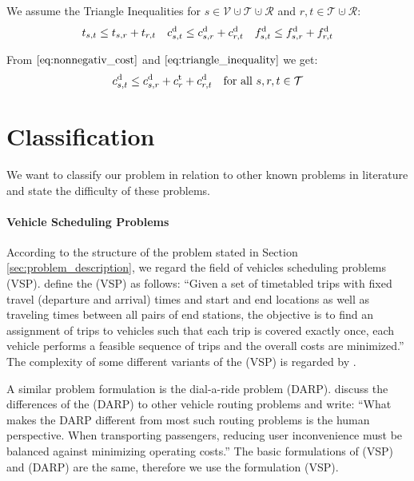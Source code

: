 We assume the Triangle Inequalities for $s\in\mathcal{V}\cupdot\mathcal{T}\cupdot\mathcal{R}$ and $r,t\in\mathcal{T}\cupdot\mathcal{R}$:
\begin{align}
\label{eq:triangle_inequality}
	t_{s,t} \leq t_{s,r} + t_{r,t} && c^{\operatorname{d}}_{s,t} \leq c^{\operatorname{d}}_{s,r} + c^{\operatorname{d}}_{r,t} && f^{\operatorname{d}}_{s,t} \leq f^{\operatorname{d}}_{s,r} + f^{\operatorname{d}}_{r,t}
\end{align}

From $\eqref{eq:nonnegativ_cost}$ and $\eqref{eq:triangle_inequality}$ we get:
\begin{align}
\label{eq:triangle_inequality_ext}
	c^{\operatorname{d}}_{s,t} \leq c^{\operatorname{d}}_{s,r} + c^{\operatorname{t}}_{r} + c^{\operatorname{d}}_{r,t} && \text{for all } s,r,t\in\mathcal{T}	
\end{align}


\section{Classification}
\label{sec:classification}

We want to classify our problem in relation to other known problems in literature and state the difficulty of these problems.

\paragraph{Vehicle Scheduling Problems} \parfill

According to the structure of the problem stated in Section \ref{sec:problem_description}, we regard the field of vehicles scheduling problems (VSP). \cite{Bunte_Kliewer} define the (VSP) as follows: ``Given a set of timetabled trips with fixed travel (departure and arrival) times and start and end locations as well as traveling times between all pairs of end stations, the objective is to find an assignment of trips to vehicles such that each trip is covered exactly once, each vehicle performs a feasible sequence of trips and the overall costs are minimized.'' The complexity of some different variants of the (VSP) is regarded by \cite{Lenstra_Kan}.

A similar problem formulation is the dial-a-ride problem (DARP). \cite{Cordeau_Laporte} discuss the differences of the (DARP) to other vehicle routing problems and write: ``What makes the DARP different from most such routing problems is the human perspective. When transporting passengers, reducing user inconvenience must be balanced against minimizing operating costs.'' The basic formulations of (VSP) and (DARP) are the same, therefore we use the formulation (VSP).

